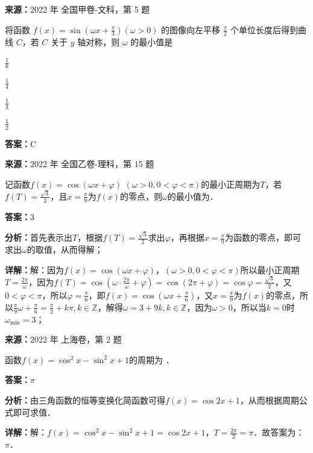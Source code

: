\begin{question}[points=5]
\textbf{来源：}2022 年 全国甲卷-文科，第 5 题\par
将函数 $f(x)=\sin\left(\omega x+\frac{\pi}{3}\right) (\omega>0)$ 的图像向左平移 $\frac{\pi}{2}$ 个单位长度后得到曲线 $C$，若 $C$ 关于 $y$ 轴对称，则 $\omega$ 的最小值是
\begin{choices}
  \item $\frac{1}{6}$
  \item $\frac{1}{4}$
  \item $\frac{1}{3}$
  \item $\frac{1}{2}$
\end{choices}
\begin{solution}
\textbf{答案：}C
\end{solution}
\end{question}

\begin{question}[points=5]
\textbf{来源：}2022 年 全国乙卷-理科，第 15 题\par
记函数$f(x) = \cos(\omega x + \varphi)$ $(\omega > 0, 0 < \varphi < \pi)$的最小正周期为$T$，若$f(T) = \frac{\sqrt{3}}{2}$，且$x = \frac{\pi}{9}$为$f(x)$的零点，则$\omega$的最小值为．
\fillin[{$3$}]
\begin{solution}
\textbf{答案：}$3$

\textbf{分析：}首先表示出$T$，根据$f(T)=\frac{\sqrt{3}}{2}$求出$\varphi$，再根据$x=\frac{\pi}{9}$为函数的零点，即可求出$\omega$的取值，从而得解；

\textbf{详解：}解：因为$f(x)=\cos(\omega x+\varphi)$，$(\omega>0,0<\varphi<\pi)$所以最小正周期$T=\frac{2\pi}{\omega}$，因为$f(T)=\cos\left(\omega\cdot\frac{2\pi}{\omega}+\varphi\right)=\cos(2\pi+\varphi)=\cos\varphi=\frac{\sqrt{3}}{2}$，又$0<\varphi<\pi$，所以$\varphi=\frac{\pi}{6}$，即$f(x)=\cos\left(\omega x+\frac{\pi}{6}\right)$，又$x=\frac{\pi}{9}$为$f(x)$的零点，所以$\frac{\pi}{9}\omega+\frac{\pi}{6}=\frac{\pi}{2}+k\pi, k\in\mathbb{Z}$，解得$\omega=3+9k, k\in\mathbb{Z}$，因为$\omega>0$，所以当$k=0$时$\omega_{\min}=3$；
\end{solution}
\end{question}

\begin{question}[points=4]
\textbf{来源：}2022 年 上海卷，第 2 题\par
函数$f(x) = \cos^2 x - \sin^2 x + 1$的周期为 ．
\fillin[{$\pi$}]
\begin{solution}
\textbf{答案：}$\pi$

\textbf{分析：}由三角函数的恒等变换化简函数可得$f(x)=\cos 2x+1$，从而根据周期公式即可求值．

\textbf{详解：}解：$f(x)=\cos^2 x - \sin^2 x + 1 = \cos 2x + 1$，$T=\frac{2\pi}{2}=\pi$．故答案为：$\pi$．
\end{solution}
\end{question}

